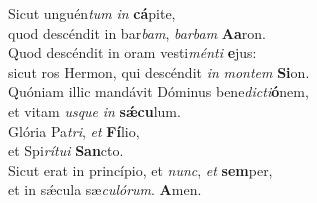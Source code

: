 \evenverse Sicut unguén\textit{tum} \textit{in} \textbf{cá}pite,~\*\\
\evenverse quod descéndit in bar\textit{bam}, \textit{bar}\textit{bam} \textbf{A}\textbf{a}ron.\\
\oddverse Quod descéndit in oram vesti\textit{mén}\textit{ti} \textbf{e}jus:~\*\\
\oddverse sicut ros Hermon, qui descéndit \textit{in} \textit{mon}\textit{tem} \textbf{Si}on.\\
\evenverse Quóniam illic mandávit Dóminus bene\textit{di}\textit{cti}\textbf{ó}nem,~\*\\
\evenverse et vitam \textit{us}\textit{que} \textit{in} \textbf{sǽ}\textbf{cu}lum.\\
\oddverse Glória Pa\textit{tri}, \textit{et} \textbf{Fí}lio,~\*\\
\oddverse et Spi\textit{rí}\textit{tu}\textit{i} \textbf{San}cto.\\
\evenverse Sicut erat in princípio, et \textit{nunc}, \textit{et} \textbf{sem}per,~\*\\
\evenverse et in sǽcula sæ\textit{cu}\textit{ló}\textit{rum}. \textbf{A}men.\\

